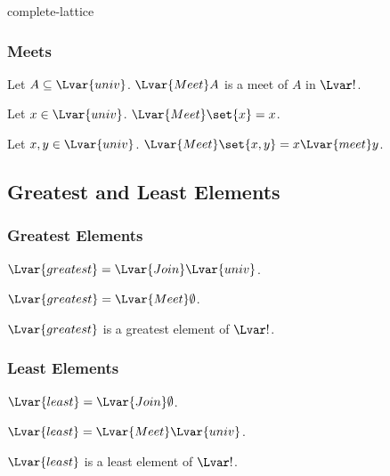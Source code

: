 \documentclass{stex}
\begin{document}
\begin{smodule}{complete-lattice}
  \subsubsection{Meets}

  \begin{forthel}
    \begin{signature*}
      Let $A \subseteq \Lvar{univ}$.
      ${\Lvar{Meet}} A$ is a meet of $A$ in $\Lvar!$.
    \end{signature*}
    
    \begin{proposition*}
      Let $x \in \Lvar{univ}$.
      ${\Lvar{Meet}} \set{x} = x$.
    \end{proposition*}
    
    \begin{proposition*}
      Let $x, y \in \Lvar{univ}$.
      ${\Lvar{Meet}} \set{x,y} = x {\Lvar{meet}} y$.
    \end{proposition*}
  \end{forthel}

  \subsection{Greatest and Least Elements}

  \subsubsection{Greatest Elements}

  \begin{forthel}
    \begin{definition*}
      ${\Lvar{greatest}} = {\Lvar{Join}} \Lvar{univ}$.
    \end{definition*}

    \begin{proposition*}
      ${\Lvar{greatest}} = {\Lvar{Meet}} \emptyset$.
    \end{proposition*}

    \begin{proposition*}
      ${\Lvar{greatest}}$ is a greatest element of $\Lvar!$.
    \end{proposition*}
  \end{forthel}

  \subsubsection{Least Elements}

  \begin{forthel}
    \begin{definition*}
      ${\Lvar{least}} = {\Lvar{Join}} \emptyset$.
    \end{definition*}

    \begin{proposition*}
      ${\Lvar{least}} = {\Lvar{Meet}} \Lvar{univ}$.
    \end{proposition*}

    \begin{proposition*}
      ${\Lvar{least}}$ is a least element of $\Lvar!$.
    \end{proposition*}
  \end{forthel}
\end{smodule}
\end{document}
